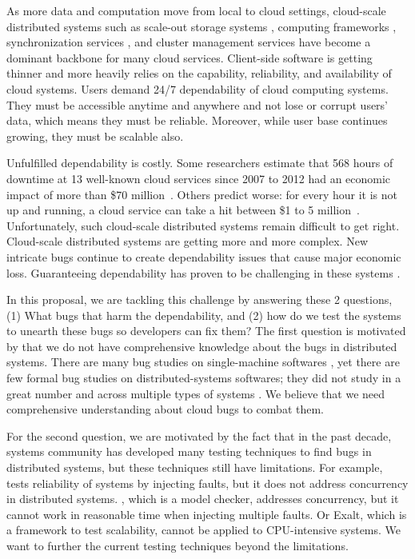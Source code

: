 As more data and computation move from local to cloud settings, cloud-scale
distributed systems such as scale-out storage systems \cite{Chang+06-BigTable,
DeCandia+07-Dynamo, Ghemawat+03-GoogleFS, Nightingale+12-FlatFDS}, computing
frameworks \cite{DeanGhemawat04-MapReduce, Murray+13-NaiadTimelyDataflow},
synchronization services \cite{Burrows06-Chubby, Hunt+10-ZooKeeperPaper}, and
cluster management services \cite{Hindman+11-Mesos, Kumar+13-Yarn} have become a
dominant backbone for many cloud services. Client-side software is getting
thinner and more heavily relies on the capability, reliability, and availability
of cloud systems. Users demand 24/7 dependability of cloud computing systems.
They must be accessible anytime and anywhere and not lose or corrupt users'
data, which means they must be reliable. Moreover, while user base continues
growing, they must be scalable also.

Unfulfilled dependability is costly. Some researchers estimate that 568 hours of
downtime at 13 well-known cloud services since 2007 to 2012 had an economic
impact of more than \$70 million~\cite{Essers12-70Million}. Others predict
worse: for every hour it is not up and running, a cloud service can take a hit
between \$1 to 5 million~\cite{Linthicum13-InfoworldCostOutages}.
Unfortunately, such cloud-scale distributed systems remain difficult to get
right. 
%
Cloud-scale distributed systems are getting more and more complex. New intricate
bugs continue to create dependability issues that cause major economic loss.
Guaranteeing dependability has proven to be challenging in these systems
\cite{Gunawi+11-FateDestini, Guo+11-Demeter, Yang+09-Modist, Wang+14-Exalt}.

In this proposal, we are tackling this challenge by answering these 2 questions,
(1) What bugs that harm the dependability, and (2) how do we test the systems to
unearth these bugs so developers can fix them? The first question is motivated
by that we do not have comprehensive knowledge about the bugs in distributed
systems. There are many bug studies on single-machine softwares
\cite{Jin+12-PerformanceBugs, Lu+08-ConcurrencyBugStudy, Palix+11-FaultsInLinux,
Sahoo+10-StudyBugsServerSoftware}, yet there are few formal bug studies on
distributed-systems softwares; they did not study in a great number and across
multiple types of systems \cite{Li+13-ScopeBugStudy, Xiao+14-NonDetMR}. We
believe that we need comprehensive understanding about cloud bugs to combat
them.

For the second question, we are motivated by the fact that in the past decade,
systems community has developed many testing techniques
\cite{Gunawi+11-FateDestini, Guo+11-Demeter, Yang+09-Modist, Wang+14-Exalt} to
find bugs in distributed systems, but these techniques still have limitations.
For example, \fate\ \cite{Gunawi+11-FateDestini} tests reliability of systems by
injecting faults, but it does not address concurrency in distributed systems.
\modist, which is a model checker, addresses concurrency, but it cannot work in
reasonable time when injecting multiple faults. Or Exalt, which is a framework
to test scalability, cannot be applied to CPU-intensive systems. We want to
further the current testing techniques beyond the limitations.

